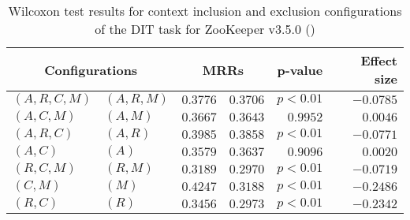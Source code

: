 
\begin{table}
\begin{spacing}{1.2}
\centering
\caption{Wilcoxon test results for context inclusion and exclusion configurations of the DIT task for ZooKeeper v3.5.0 (\ctwo)}
\label{table:versus-wilcox-zookeeper-dit-context}
\begin{tabular}{ll|rr|rr}
\toprule
      \multicolumn{2}{c|}{Configurations} &                \multicolumn{2}{c|}{MRRs} &             p-value & Effect size \\
\midrule
 $(A,R,C,M)$ &  $(A,R,M)$ &  $\bm{0.3776}$ &       $0.3706$ & $p<0.01$ &   $-0.0785$ \\
   $(A,C,M)$ &    $(A,M)$ &  $\bm{0.3667}$ &       $0.3643$ & $0.9952$ &    $0.0046$ \\
   $(A,R,C)$ &    $(A,R)$ &  $\bm{0.3985}$ &       $0.3858$ & $p<0.01$ &   $-0.0771$ \\
     $(A,C)$ &      $(A)$ &       $0.3579$ &  $\bm{0.3637}$ & $0.9096$ &    $0.0020$ \\
   $(R,C,M)$ &    $(R,M)$ &  $\bm{0.3189}$ &       $0.2970$ & $p<0.01$ &   $-0.0719$ \\
     $(C,M)$ &      $(M)$ &  $\bm{0.4247}$ &       $0.3188$ & $p<0.01$ &   $-0.2486$ \\
     $(R,C)$ &      $(R)$ &  $\bm{0.3456}$ &       $0.2973$ & $p<0.01$ &   $-0.2342$ \\
\bottomrule
\end{tabular}

\end{spacing}
\end{table}

